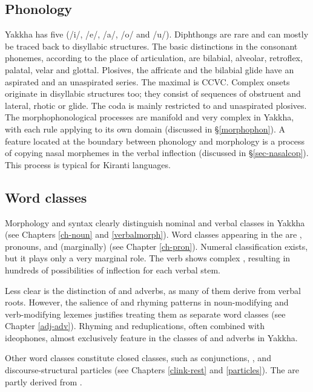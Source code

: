 \subsection{Phonology}

Yakkha has five  (/i/, /e/, /a/, /o/ and /u/). Diphthongs are rare and can mostly be traced back to disyllabic structures. The basic distinctions in the consonant phonemes, according to  the place of articulation, are bilabial, alveolar, retroflex, palatal, velar and glottal. Plosives, the affricate and the bilabial glide have an aspirated and an unaspirated series. The maximal  is CCVC. Complex onsets originate in disyllabic structures too; they consist of sequences of obstruent and lateral, rhotic or glide. The  coda is mainly restricted to  and unaspirated plosives. The morphophonological processes are manifold and very complex in Yakkha, with each rule applying to its own domain (discussed in §\ref{morphophon}). A feature located at the boundary between phonology and morphology is a process of copying nasal morphemes in the verbal inflection (discussed in §\ref{sec-nasalcop}). This process is typical for Kiranti languages.


\subsection{Word classes}

Morphology and syntax clearly distinguish nominal and verbal classes in Yakkha (see Chapters \ref{ch-noun} and \ref{verbalmorph}). Word classes appearing in the  are , pronouns,   and (marginally)  (see Chapter \ref{ch-pron}). Numeral classification exists, but it plays only a very marginal role. The verb shows complex , resulting in hundreds of possibilities of inflection for each verbal stem. 


Less clear is the distinction of  and adverbs, as many of them derive from verbal roots. However, the salience of  and rhyming patterns in noun-modifying and verb-modifying lexemes justifies treating them as separate word classes (see Chapter \ref{adj-adv}). Rhyming and reduplications, often combined with ideophones, almost exclusively feature in the classes of  and adverbs in Yakkha.


Other word classes constitute closed classes, such as conjunctions, ,  and discourse-structural particles (see Chapters  \ref{clink-rest} and \ref{particles}). The  are partly derived from . 


